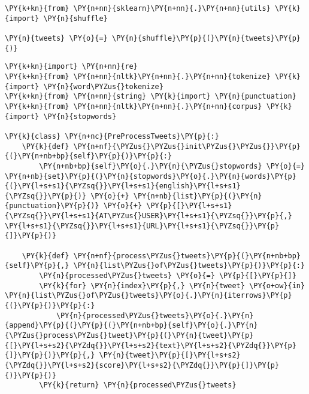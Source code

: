 \documentclass[11pt]{article}
\begin{document}
    \begin{tcolorbox}[breakable, size=fbox, boxrule=1pt, pad at break*=1mm,colback=cellbackground, colframe=cellborder]
\begin{Verbatim}[commandchars=\\\{\}]
\PY{k+kn}{from} \PY{n+nn}{sklearn}\PY{n+nn}{.}\PY{n+nn}{utils} \PY{k}{import} \PY{n}{shuffle}

\PY{n}{tweets} \PY{o}{=} \PY{n}{shuffle}\PY{p}{(}\PY{n}{tweets}\PY{p}{)}
\end{Verbatim}
\end{tcolorbox}

    \begin{tcolorbox}[breakable, size=fbox, boxrule=1pt, pad at break*=1mm,colback=cellbackground, colframe=cellborder]
\begin{Verbatim}[commandchars=\\\{\}]
\PY{k+kn}{import} \PY{n+nn}{re}
\PY{k+kn}{from} \PY{n+nn}{nltk}\PY{n+nn}{.}\PY{n+nn}{tokenize} \PY{k}{import} \PY{n}{word\PYZus{}tokenize}
\PY{k+kn}{from} \PY{n+nn}{string} \PY{k}{import} \PY{n}{punctuation}
\PY{k+kn}{from} \PY{n+nn}{nltk}\PY{n+nn}{.}\PY{n+nn}{corpus} \PY{k}{import} \PY{n}{stopwords}

\PY{k}{class} \PY{n+nc}{PreProcessTweets}\PY{p}{:}
    \PY{k}{def} \PY{n+nf}{\PYZus{}\PYZus{}init\PYZus{}\PYZus{}}\PY{p}{(}\PY{n+nb+bp}{self}\PY{p}{)}\PY{p}{:}
        \PY{n+nb+bp}{self}\PY{o}{.}\PY{n}{\PYZus{}stopwords} \PY{o}{=} \PY{n+nb}{set}\PY{p}{(}\PY{n}{stopwords}\PY{o}{.}\PY{n}{words}\PY{p}{(}\PY{l+s+s1}{\PYZsq{}}\PY{l+s+s1}{english}\PY{l+s+s1}{\PYZsq{}}\PY{p}{)} \PY{o}{+} \PY{n+nb}{list}\PY{p}{(}\PY{n}{punctuation}\PY{p}{)} \PY{o}{+} \PY{p}{[}\PY{l+s+s1}{\PYZsq{}}\PY{l+s+s1}{AT\PYZus{}USER}\PY{l+s+s1}{\PYZsq{}}\PY{p}{,} \PY{l+s+s1}{\PYZsq{}}\PY{l+s+s1}{URL}\PY{l+s+s1}{\PYZsq{}}\PY{p}{]}\PY{p}{)}

    \PY{k}{def} \PY{n+nf}{process\PYZus{}tweets}\PY{p}{(}\PY{n+nb+bp}{self}\PY{p}{,} \PY{n}{list\PYZus{}of\PYZus{}tweets}\PY{p}{)}\PY{p}{:}
        \PY{n}{processed\PYZus{}tweets} \PY{o}{=} \PY{p}{[}\PY{p}{]}
        \PY{k}{for} \PY{n}{index}\PY{p}{,} \PY{n}{tweet} \PY{o+ow}{in} \PY{n}{list\PYZus{}of\PYZus{}tweets}\PY{o}{.}\PY{n}{iterrows}\PY{p}{(}\PY{p}{)}\PY{p}{:}
            \PY{n}{processed\PYZus{}tweets}\PY{o}{.}\PY{n}{append}\PY{p}{(}\PY{p}{(}\PY{n+nb+bp}{self}\PY{o}{.}\PY{n}{\PYZus{}process\PYZus{}tweet}\PY{p}{(}\PY{n}{tweet}\PY{p}{[}\PY{l+s+s2}{\PYZdq{}}\PY{l+s+s2}{text}\PY{l+s+s2}{\PYZdq{}}\PY{p}{]}\PY{p}{)}\PY{p}{,} \PY{n}{tweet}\PY{p}{[}\PY{l+s+s2}{\PYZdq{}}\PY{l+s+s2}{score}\PY{l+s+s2}{\PYZdq{}}\PY{p}{]}\PY{p}{)}\PY{p}{)}
        \PY{k}{return} \PY{n}{processed\PYZus{}tweets}


\end{Verbatim}
\end{tcolorbox}
\end{document}
